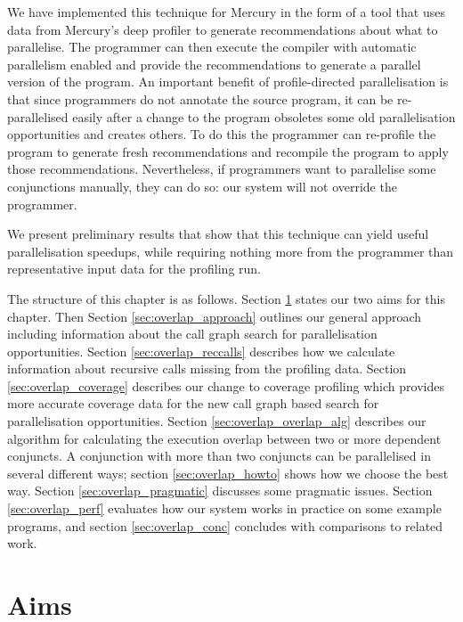We have implemented this technique for Mercury
in the form of a tool
that uses data from Mercury's deep profiler
to generate recommendations about what to parallelise.
The programmer can then execute the compiler with automatic parallelism
enabled and provide the recommendations to generate a parallel version of
the program.
An important benefit of profile-directed parallelisation is that
since programmers do not annotate the source program,
it can be re-parallelised easily after a change to the program
obsoletes some old parallelisation opportunities and creates others.
To do this the programmer can re-profile the program to generate fresh
recommendations and recompile the program to apply those recommendations.
Nevertheless, if programmers want to parallelise some conjunctions manually,
they can do so: our system will not override the programmer.

We present preliminary results that show that
this technique can yield useful parallelisation speedups,
while requiring nothing more from the programmer
than representative input data for the profiling run.

The structure of this chapter is as follows.
Section \ref{sec:overlap_aims} states our two aims for this chapter.
Then Section \ref{sec:overlap_approach} outlines our general approach
including information about the call graph search for parallelisation
opportunities.
Section \ref{sec:overlap_reccalls}
describes how we calculate information about recursive calls missing from
the profiling data.
Section \ref{sec:overlap_coverage}
describes our change to coverage profiling which provides more accurate
coverage data for the new call graph based search for parallelisation
opportunities.
Section \ref{sec:overlap_overlap_alg} describes our algorithm for
calculating the execution overlap between two or more dependent conjuncts.
A conjunction with more than two conjuncts can be parallelised
in several different ways;
section \ref{sec:overlap_howto} shows how we choose the best way.
Section \ref{sec:overlap_pragmatic} discusses some pragmatic issues.
Section \ref{sec:overlap_perf} evaluates
how our system works in practice on some example programs, and
section \ref{sec:overlap_conc} concludes
with comparisons to related work.

\section{Aims}
\label{sec:overlap_aims}

